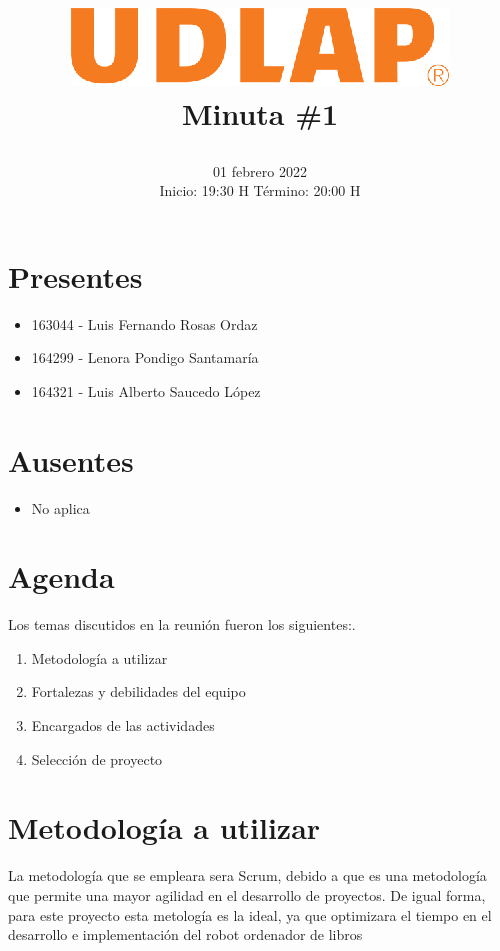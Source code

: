 \documentclass[12pt, a4paper]{article}
\title{
	\includegraphics[width=10cm]{udlap.eps}\vspace{2ex} 
	\\ 
	\titlefont Minuta \#1\vspace{-3ex}
	\author{} %
}
\date{
\huge 01 febrero 2022 \\ \vspace{0.5ex}
\large Inicio: 19:30 H \quad Término: 20:00 H}
\begin{document}
\maketitle %
\begin{minipage}[t]{0.4\textwidth}
\section*{Presentes}
\begin{itemize}
\item 163044 - Luis Fernando Rosas Ordaz
\item 164299 - Lenora Pondigo Santamar\'ia 
\item 164321 - Luis Alberto Saucedo L\'opez 
\end{itemize}
\end{minipage}
\begin{minipage}[t]{0.5\textwidth}
\section*{Ausentes}
\begin{itemize}
\item No aplica
\end{itemize}
\end{minipage}

\section*{Agenda}
Los temas discutidos en la reuni\'on fueron los siguientes:.
\begin{enumerate}
\item Metodología a utilizar
\item Fortalezas y debilidades del equipo
\item Encargados de las actividades
\item Selecci\'on de proyecto
\end{enumerate}
\section{Metodología a utilizar}
La metodología que se empleara sera Scrum, debido a que es una metodología que permite una mayor agilidad en el desarrollo de proyectos.
De igual forma, para este proyecto esta metolog\'ia es la ideal, ya que optimizara el tiempo en el desarrollo e implementaci\'on del robot ordenador de libros
\end{document}
